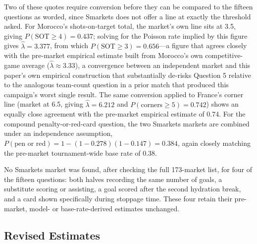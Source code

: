 \documentclass[11pt]{article}
\begin{document}
Two of these quotes require conversion before they can be compared to the fifteen
questions as worded, since Smarkets does not offer a line at exactly the threshold asked.
For Morocco's shots-on-target total, the market's own line sits at 3.5, giving
$P(\text{SOT} \ge 4) = 0.437$; solving for the Poisson rate implied by this figure gives
$\hat\lambda = 3.377$, from which $P(\text{SOT} \ge 3) = 0.656$---a figure that agrees
closely with the pre-market empirical estimate built from Morocco's own competitive-game
average ($\hat\lambda \approx 3.33$), a convergence between an independent market and this
paper's own empirical construction that substantially de-risks Question 5 relative to the
analogous team-count question in a prior match that produced this campaign's worst single
result. The same conversion applied to France's corner line (market at 6.5, giving
$\hat\lambda = 6.212$ and $P(\text{corners} \ge 5) = 0.742$) shows an equally close
agreement with the pre-market empirical estimate of 0.74. For the compound
penalty-or-red-card question, the two Smarkets markets are combined under an
independence assumption, $P(\text{pen or red}) = 1 - (1 - 0.278)(1 - 0.147) = 0.384$,
again closely matching the pre-market tournament-wide base rate of 0.38.

No Smarkets market was found, after checking the full 173-market list, for four of the
fifteen questions: both halves recording the same number of goals, a substitute scoring
or assisting, a goal scored after the second hydration break, and a card shown
specifically during stoppage time. These four retain their pre-market, model- or
base-rate-derived estimates unchanged.

\subsection{Revised Estimates}
\end{document}
